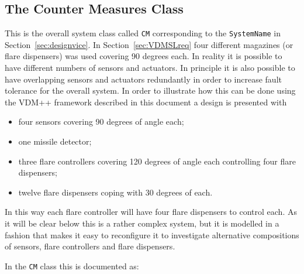 \documentclass{overturerepchap}
\begin{document}
\subsection{The Counter Measures Class}

This is the overall system class called \texttt{CM} corresponding to
the \texttt{SystemName} in Section~\ref{sec:designvice}.
In Section~\ref{sec:VDMSLreq} four different magazines (or flare
dispensers) was used covering 90 degrees each. In reality it is
possible to have different numbers of sensors and actuators. In
principle it is also possible to have overlapping sensors and
actuators redundantly in order to increase fault tolerance for the
overall system. In order to illustrate how this can be done using the
VDM++ framework described in this document a design is presented with
\begin{itemize}
\item four sensors covering 90 degrees of angle each;
\item one missile detector;
\item three flare controllers covering 120 degrees of angle each
controlling four flare dispensers;
\item twelve flare dispensers coping with 30 degrees of each.
\end{itemize}

In this way each flare controller will have four flare dispensers to
control each. As it will be clear below this is a rather complex
system, but it is modelled in a fashion that makes it easy to
reconfigure it to investigate alternative compositions of
sensors, flare controllers and flare dispensers.

In the \texttt{CM} class this is documented as:
\newpage
\end{document}
